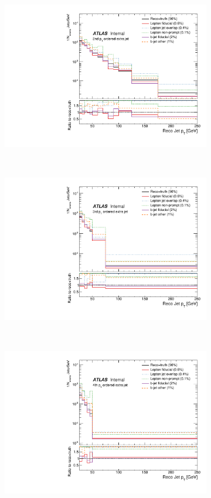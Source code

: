 \begin{figure}
\begin{subfigure}[]{0.3\textwidth}
\includegraphics[width=\textwidth]{fig/RecoNotTruth/RecoPtJet1.pdf}
\end{subfigure}
~
\begin{subfigure}[]{0.3\textwidth}
\includegraphics[width=\textwidth]{fig/RecoNotTruth/RecoPtJet2.pdf}
\end{subfigure}
~
\begin{subfigure}[]{0.3\textwidth}
\includegraphics[width=\textwidth]{fig/RecoNotTruth/RecoPtJet3.pdf}

\end{subfigure}
\end{figure}
